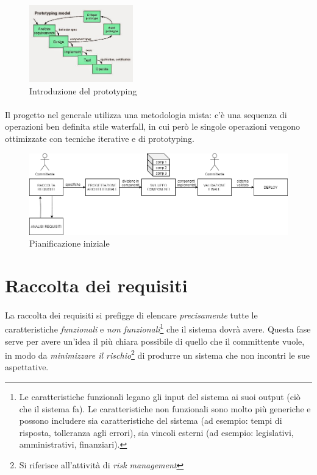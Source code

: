 \documentclass[11pt,a4paper,english]{article}
\begin{document}
\begin{figure}[H]
    \centering
    \includegraphics[width=0.4\textwidth]{img/prototyping.jpg}
    \caption{Introduzione del prototyping}
\end{figure}

\paragraph{} Il progetto nel generale utilizza una metodologia mista: c'è una sequenza di operazioni ben definita stile waterfall, in cui però le singole operazioni vengono ottimizzate con tecniche iterative e di prototyping. 

\begin{figure}[H]
    \centering
    \includegraphics[width=1\textwidth]{img/pianificazione iniziale.png}
    \caption{Pianificazione iniziale}
\end{figure}


\section{Raccolta dei requisiti}

\paragraph{} La raccolta dei requisiti si prefigge di elencare \emph{precisamente} tutte le caratteristiche \emph {funzionali} e \emph{non funzionali}\footnote{Le caratteristiche funzionali legano gli input del sistema ai suoi output (ciò che il sistema fa). Le caratteristiche non funzionali sono molto più generiche e possono includere sia caratteristiche del sistema (ad esempio: tempi di risposta, tolleranza agli errori), sia vincoli esterni (ad esempio: legislativi, amministrativi, finanziari).} che il sistema dovrà avere. Questa fase serve per avere un'idea il più chiara possibile di quello che il committente vuole, in modo da \emph{minimizzare il rischio}\footnote{Si riferisce all'attività di \emph{risk management}} di produrre un sistema che non incontri le sue aspettative.
\end{document}

